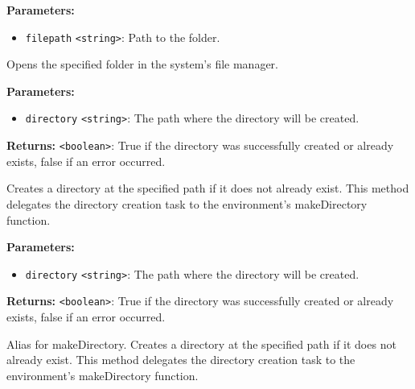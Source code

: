 \documentclass[12pt,a4paper]{article}
\begin{document}
\noindent \textbf{Parameters:}
\begin{itemize}
  \item \texttt{filepath} \texttt{<string>}: Path to the folder.
\end{itemize}

\noindent Opens the specified folder in the system's file manager.

\vspace{5mm}
\noindent {}


\noindent \textbf{Parameters:}
\begin{itemize}
  \item \texttt{directory} \texttt{<string>}: The path where the directory will be created.
\end{itemize}

\noindent \textbf{Returns:} \texttt{<boolean>}: True if the directory was successfully created or already exists, false if an error occurred.

\noindent Creates a directory at the specified path if it does not already exist.
This method delegates the directory creation task to the environment's makeDirectory function.

\vspace{5mm}
\noindent {}


\noindent \textbf{Parameters:}
\begin{itemize}
  \item \texttt{directory} \texttt{<string>}: The path where the directory will be created.
\end{itemize}

\noindent \textbf{Returns:} \texttt{<boolean>}: True if the directory was successfully created or already exists, false if an error occurred.

\noindent Alias for makeDirectory. Creates a directory at the specified path if it does not already exist.
This method delegates the directory creation task to the environment's makeDirectory function.

\vspace{5mm}
\noindent {}
\end{document}
